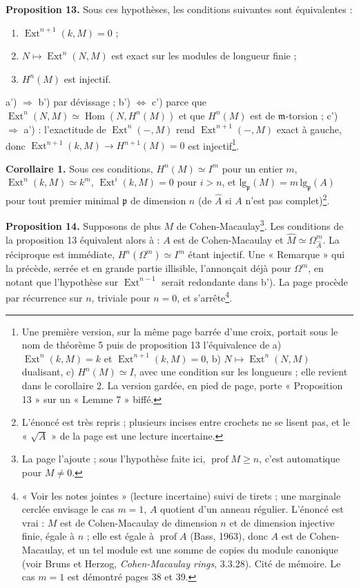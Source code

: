 \documentclass[11pt,a4paper]{article}
\begin{document}
\textbf{Proposition 13.} Sous ces hypothèses, les conditions suivantes sont
équivalentes :
\begin{enumerate}
\item[a')] $\operatorname{Ext}^{n+1}(k, M) = 0$ ;
\item[b')] $N \mapsto \operatorname{Ext}^n(N, M)$ est exact sur les modules de
longueur finie ;
\item[c')] $H^n(M)$ est injectif.
\end{enumerate}
a') $\Rightarrow$ b') par dévissage ; b') $\Leftrightarrow$ c') parce que
$\operatorname{Ext}^n(N, M) \simeq \operatorname{Hom}(N, H^n(M))$ et que
$H^n(M)$ est de $\mathfrak{m}$-torsion ; c') $\Rightarrow$ a') : l'exactitude
de $\operatorname{Ext}^n(-, M)$ rend $\operatorname{Ext}^{n+1}(-, M)$ exact à
gauche, donc $\operatorname{Ext}^{n+1}(k, M) \to H^{n+1}(M) = 0$ est
injectif\footnote{Une première version, sur la même page barrée d'une croix,
portait sous le nom de théorème 5 puis de proposition 13 l'équivalence de
a) $\operatorname{Ext}^n(k, M) = k$ et $\operatorname{Ext}^{n+1}(k, M) = 0$,
b) $N \mapsto \operatorname{Ext}^n(N, M)$ dualisant, c) $H^n(M) \simeq I$, avec
une condition sur les longueurs ; elle revient dans le corollaire 2. La version
gardée, en pied de page, porte « Proposition 13 » sur un « Lemme 7 » biffé.}.

\textbf{Corollaire 1.} Sous ces conditions, $H^n(M) \simeq I^m$ pour un entier
$m$, $\operatorname{Ext}^n(k, M) \simeq k^m$, $\operatorname{Ext}^i(k, M) = 0$
pour $i > n$, et $\mathrm{lg}_{\mathfrak{p}}(M) = m\,
\mathrm{lg}_{\mathfrak{p}}(A)$ pour tout premier minimal $\mathfrak{p}$ de
dimension $n$ (de $\widehat{A}$ si $A$ n'est pas complet)\footnote{L'énoncé
est très repris ; plusieurs incises entre crochets ne se lisent pas, et le
« $\sqrt{A}$ » de la page est une lecture incertaine.}.

\textbf{Proposition 14.} Supposons de plus $M$ de Cohen-Macaulay\footnote{La
page l'ajoute ; sous l'hypothèse faite ici, $\operatorname{prof} M \geqslant
n$, c'est automatique pour $M \neq 0$.}. Les conditions de la proposition 13
équivalent alors à : $A$ est de Cohen-Macaulay et $\widehat{M} \simeq
\Omega_{\widehat{A}}^m$. La réciproque est immédiate, $H^n(\Omega^m) \simeq
I^m$ étant injectif. Une « Remarque » qui la précède, serrée et en grande partie illisible,
l'annonçait déjà pour $\Omega^m$, en notant que l'hypothèse sur
$\operatorname{Ext}^{n-1}$ serait redondante dans b'). La page procède par
récurrence sur $n$, triviale pour $n = 0$, et s'arrête\footnote{« Voir les
notes jointes » (lecture incertaine) suivi de tirets ; une marginale cerclée
envisage le cas $m = 1$, $A$ quotient d'un anneau régulier. L'énoncé est vrai : $M$ est de Cohen-Macaulay de dimension $n$ et de
dimension injective finie, égale à $n$ ; elle est égale à $\operatorname{prof}
A$ (Bass, 1963), donc $A$ est de Cohen-Macaulay, et un tel module est une
somme de copies du module canonique (voir Bruns et Herzog,
\emph{Cohen-Macaulay rings}, 3.3.28). Cité de mémoire. Le cas $m = 1$ est
démontré pages 38 et 39.}.
\end{document}
